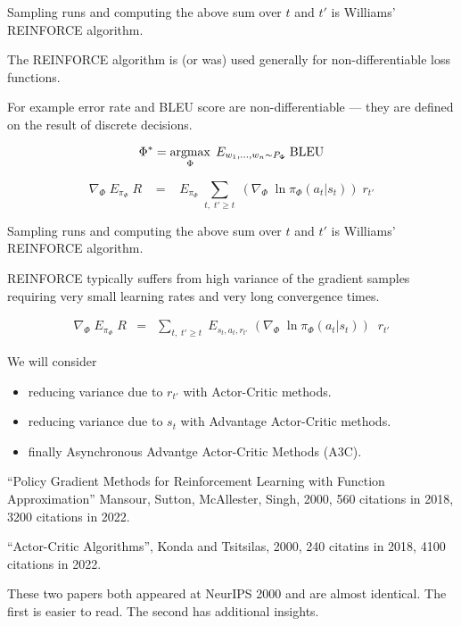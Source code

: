 {\vfill
Sampling runs and computing the above sum over $t$ and $t'$ is Williams' REINFORCE algorithm.


The REINFORCE algorithm is (or was) used generally for non-differentiable loss functions.

\vfill
For example error rate and BLEU score are non-differentiable --- they are defined on the result of discrete decisions.

\vfill
$$\Phi^* = \operatorname*{argmax}_\Phi \;E_{w_1,\ldots,w_n \sim P_\Phi}\;\mathrm{BLEU}$$


$$\nabla_\Phi \;E_{\pi_\Phi}\;R \;\;\; = \;\;\; E_{\pi_\Phi}\; \sum_{t,\;t' \geq t} \; \left(\nabla_\Phi\;\ln \pi_\Phi(a_t|s_t)\right) \;r_{t'}$$

\vfill
Sampling runs and computing the above sum over $t$ and $t'$ is Williams' REINFORCE algorithm.


REINFORCE typically suffers from high variance of the gradient samples requiring very small learning rates and very long convergence times.

\begin{eqnarray*}
    \nabla_\Phi \; E_{\pi_\Phi}\; R  & = & \sum_{t,\;t'\geq t}\; E_{s_t,a_t,r_{t'}}\; \left(\nabla_\Phi\;\ln \pi_\Phi(a_{t}|s_{t})\right)\;\;r_{t'}
\end{eqnarray*}

\vfill
We will consider
\begin{itemize}
\item reducing variance due to $r_{t'}$ with Actor-Critic methods.
\item reducing variance due to  $s_t$ with Advantage Actor-Critic methods.
\item finally Asynchronous Advantge Actor-Critic Methods (A3C).
\end{itemize}


``Policy Gradient Methods for
Reinforcement Learning with Function
Approximation''  Mansour, Sutton, McAllester, Singh, 2000, {\color{red} 560} citations in 2018, {\color{red} 3200} citations in 2022.

\vfill
``Actor-Critic Algorithms'', Konda and Tsitsilas, 2000, {\color{red} 240} citatins in 2018, {\color{red} 4100} citations in 2022.

\vfill
These two papers both appeared at NeurIPS 2000 and are almost identical.
The first is easier to read.  The second has additional insights.


}
